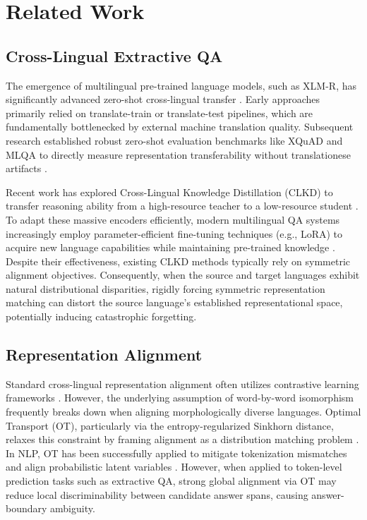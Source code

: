 \documentclass[11pt]{article}
\begin{document}
\section{Related Work}

\subsection{Cross-Lingual Extractive QA}
The emergence of multilingual pre-trained language models, such as XLM-R, has significantly advanced zero-shot cross-lingual transfer \cite{conneau-etal-2020-unsupervised}. Early approaches primarily relied on translate-train or translate-test pipelines, which are fundamentally bottlenecked by external machine translation quality. Subsequent research established robust zero-shot evaluation benchmarks like XQuAD and MLQA to directly measure representation transferability without translationese artifacts \cite{artetxe-etal-2020-cross, lewis-etal-2020-mlqa}. 

Recent work has explored Cross-Lingual Knowledge Distillation (CLKD) to transfer reasoning ability from a high-resource teacher to a low-resource student \cite{gupta-etal-2023-cross}. To adapt these massive encoders efficiently, modern multilingual QA systems increasingly employ parameter-efficient fine-tuning techniques (e.g., LoRA) to acquire new language capabilities while maintaining pre-trained knowledge \cite{hu2021loralowrankadaptationlarge}. Despite their effectiveness, existing CLKD methods typically rely on symmetric alignment objectives. Consequently, when the source and target languages exhibit natural distributional disparities, rigidly forcing symmetric representation matching can distort the source language's established representational space, potentially inducing catastrophic forgetting.

\subsection{Representation Alignment}
Standard cross-lingual representation alignment often utilizes contrastive learning frameworks \cite{chi-etal-2021-infoxlm}. However, the underlying assumption of word-by-word isomorphism frequently breaks down when aligning morphologically diverse languages. Optimal Transport (OT), particularly via the entropy-regularized Sinkhorn distance, relaxes this constraint by framing alignment as a distribution matching problem \cite{cuturi2013sinkhorndistanceslightspeedcomputation}. In NLP, OT has been successfully applied to mitigate tokenization mismatches and align probabilistic latent variables \cite{sherborne-etal-2023-optimal}. However, when applied to token-level prediction tasks such as extractive QA, strong global alignment via OT may reduce local discriminability between candidate answer spans, causing answer-boundary ambiguity.
\end{document}
